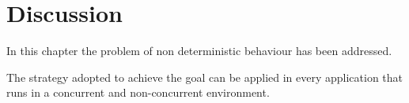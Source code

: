 



\section{Discussion}
In this chapter the problem of non deterministic behaviour has been addressed.%

The strategy adopted to achieve the goal can be applied in every application that runs in a concurrent and non-concurrent environment.


\clearpage
\thispagestyle{empty}